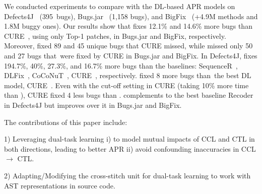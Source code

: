 We conducted experiments to compare {\tool} with the DL-based APR
models on Defects4J~\cite{defects4j} (395~bugs),
Bugs.jar~\cite{saha2018bugs} (1,158 bugs), and
BigFix~\cite{yioopsla19} (+4.9M methods and 1.8M buggy ones). Our
results show that {\tool} fixes 12.1\% and 14.6\% more bugs than
CURE~\cite{cure-icse21}, using only Top-1 patches, in Bugs.jar and
BigFix, respectively. Moreover, {\tool} fixed 89 and 45 unique bugs
that CURE missed, while {\tool} missed only 50 and 27 bugs that~were
fixed by CURE in Bugs.jar and BigFix. In Defects4J, {\tool} fixes
194.7\%, 40\%, 27.3\%, and 16.7\% more bugs than the baselines:
SequenceR~\cite{chen2018sequencer}, DLFix~\cite{icse20},
CoCoNuT~\cite{lutellier2020coconut}, CURE~\cite{cure-icse21},
respectively.  {\tool} fixed 8 more bugs than~the best DL model,
CURE~\cite{cure-icse21}.  Even with the cut-off setting in CURE
(taking 10\% more time than {\tool}), CURE fixed 4 less bugs than
{\tool}. {\tool} complements to the best baseline Recoder in Defects4J
but improves over it in Bugs.jar and BigFix.

The contributions of this paper include:





1) Leveraging dual-task learning i) to model mutual impacts of CCL and
CTL in both directions, leading to better APR ii) avoid confounding
inaccuracies in CCL $\rightarrow$ CTL.

2) Adapting/Modifying the cross-stitch unit for dual-task
learning to work with AST representations in source code.





